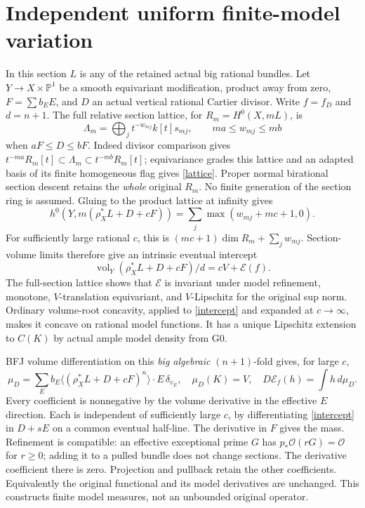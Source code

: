 \documentclass[10pt]{article}
\newcommand{\vol}{\operatorname{vol}}
\newcommand{\OO}{\mathcal O}
\begin{document}
\section{Independent uniform finite-model variation}\label{variation-section}
In this section $L$ is any of the retained actual big rational bundles.
Let $Y\to X\times\mathbb P^1$ be a smooth equivariant modification,
product away from zero, $F=\sum b_EE$, and $D$ an actual vertical
rational Cartier divisor. Write $f=f_D$ and $d=n+1$.
The full relative section lattice, for $R_m=H^0(X,mL)$, is
\begin{equation}\label{lattice}
 \Lambda_m=\bigoplus_j t^{-w_{mj}}k[t]s_{mj},\qquad
 ma\leq w_{mj}\leq mb
\end{equation}
when $aF\leq D\leq bF$. Indeed divisor comparison gives
$t^{-ma}R_m[t]\subset\Lambda_m\subset t^{-mb}R_m[t]$;
equivariance grades this lattice and an adapted basis of its finite
homogeneous flag gives \eqref{lattice}. Proper normal birational section
descent retains the \emph{whole} original $R_m$. No finite generation
of the section ring is assumed. Gluing to the product lattice at infinity gives
\begin{equation}\label{dimformula}
 h^0(Y,m(\rho_X^*L+D+cF))
          =\sum_j\max(w_{mj}+mc+1,0).
\end{equation}
For sufficiently large rational $c$, this is $(mc+1)\dim R_m+\sum_jw_{mj}$.
Section-volume limits therefore give an intrinsic eventual intercept
\begin{equation}\label{intercept}
 \vol_Y(\rho_X^*L+D+cF)/d=cV+\mathscr E(f).
\end{equation}
The full-section lattice shows that $\mathscr E$ is invariant under
model refinement, monotone, $V$-translation equivariant, and
$V$-Lipschitz for the original sup norm. Ordinary volume-root concavity,
applied to \eqref{intercept} and expanded at $c\to\infty$, makes it
concave on rational model functions. It has a unique Lipschitz extension
to $C(K)$ by actual ample model density from G0.

BFJ volume differentiation on this \emph{big algebraic} $(n+1)$-fold gives,
for large $c$,
\begin{equation}\label{finite-mu}
 \mu_D=\sum_E b_E\langle(\rho_X^*L+D+cF)^n\rangle\cdot E\,\delta_{v_E},
 \quad \mu_D(K)=V,\quad D\mathscr E_f(h)=\int h\,d\mu_D.
\end{equation}
Every coefficient is nonnegative by the volume derivative in the effective
$E$ direction. Each is independent of sufficiently large $c$, by
differentiating \eqref{intercept} in $D+sE$ on a common eventual half-line.
The derivative in $F$ gives the mass. Refinement is compatible: an
effective exceptional prime $G$ has $p_*\OO(rG)=\OO$ for $r\geq0$;
adding it to a pulled bundle does not change sections. The derivative
coefficient there is zero. Projection and pullback retain the other
coefficients. Equivalently the original functional and its model
derivatives are unchanged. This constructs finite model measures, not
an unbounded original operator.
\end{document}

